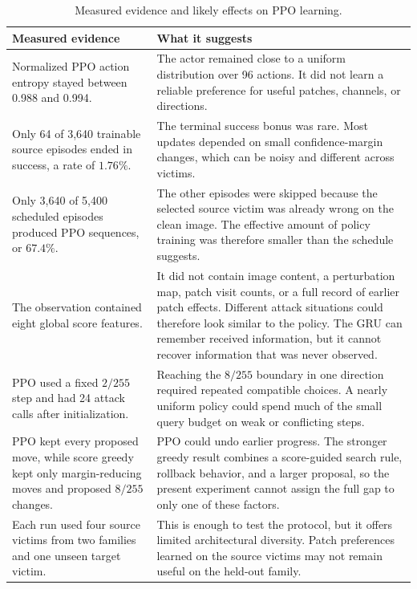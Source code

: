 \documentclass[11pt,a4paper]{report}
\begin{document}
\begin{table}[H]
\centering
\small
\caption{Measured evidence and likely effects on PPO learning.}
\begin{tabularx}{\textwidth}{L{0.31\textwidth}Y}
\toprule
\textbf{Measured evidence} & \textbf{What it suggests} \\
\midrule
Normalized PPO action entropy stayed between 0.988 and 0.994. &
The actor remained close to a uniform distribution over 96 actions. It did not learn a reliable preference for useful patches, channels, or directions. \\
\midrule
Only 64 of 3,640 trainable source episodes ended in success, a rate of \(1.76\%\). &
The terminal success bonus was rare. Most updates depended on small confidence-margin changes, which can be noisy and different across victims. \\
\midrule
Only 3,640 of 5,400 scheduled episodes produced PPO sequences, or \(67.4\%\). &
The other episodes were skipped because the selected source victim was already wrong on the clean image. The effective amount of policy training was therefore smaller than the schedule suggests. \\
\midrule
The observation contained eight global score features. &
It did not contain image content, a perturbation map, patch visit counts, or a full record of earlier patch effects. Different attack situations could therefore look similar to the policy. The GRU can remember received information, but it cannot recover information that was never observed. \\
\midrule
PPO used a fixed \(2/255\) step and had 24 attack calls after initialization. &
Reaching the \(8/255\) boundary in one direction required repeated compatible choices. A nearly uniform policy could spend much of the small query budget on weak or conflicting steps. \\
\midrule
PPO kept every proposed move, while score greedy kept only margin-reducing moves and proposed \(8/255\) changes. &
PPO could undo earlier progress. The stronger greedy result combines a score-guided search rule, rollback behavior, and a larger proposal, so the present experiment cannot assign the full gap to only one of these factors. \\
\midrule
Each run used four source victims from two families and one unseen target victim. &
This is enough to test the protocol, but it offers limited architectural diversity. Patch preferences learned on the source victims may not remain useful on the held-out family. \\
\bottomrule
\end{tabularx}
\end{table}
\end{document}
